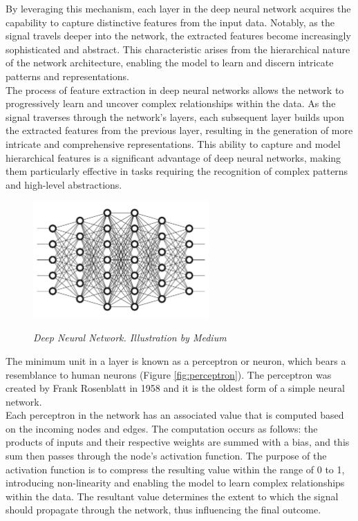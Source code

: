 By leveraging this mechanism, each layer in the deep neural network acquires
the capability to capture distinctive features from the input data. Notably, as
the signal travels deeper into the network, the extracted features become
increasingly sophisticated and abstract. This characteristic arises from the
hierarchical nature of the network architecture, enabling the model to learn
and discern intricate patterns and representations. \\

The process of feature extraction in deep neural networks allows the network to
progressively learn and uncover complex relationships within the data. As the
signal traverses through the network's layers, each subsequent layer builds
upon the extracted features from the previous layer, resulting in the
generation of more intricate and comprehensive representations. This ability to
capture and model hierarchical features is a significant advantage of deep
neural networks, making them particularly effective in tasks requiring the
recognition of complex patterns and high-level abstractions.

\begin{figure}[H]
  \centering
  \includegraphics[width=0.6\textwidth]{imatges/preliminaries/deepnn.jpg}
  \caption[Deep Neural Network] {\textit{Deep Neural Network.
  Illustration by Medium}}
  {\label{fig:deep-nn}}
\end{figure}

The minimum unit in a layer is known as a perceptron or neuron, which bears a
resemblance to human neurons (Figure \ref{fig:perceptron}). The perceptron was
created by Frank Rosenblatt in 1958 and it is the oldest form of a simple
neural network. \\

Each perceptron in the network has an associated value that is computed based
on the incoming nodes and edges. The computation occurs as follows: the
products of inputs and their respective weights are summed with a bias, and
this sum then passes through the node's activation function. The purpose of the
activation function is to compress the resulting value within the range of 0 to
1, introducing non-linearity and enabling the model to learn complex
relationships within the data. The resultant value determines the extent to
which the signal should propagate through the network, thus influencing the
final outcome.



